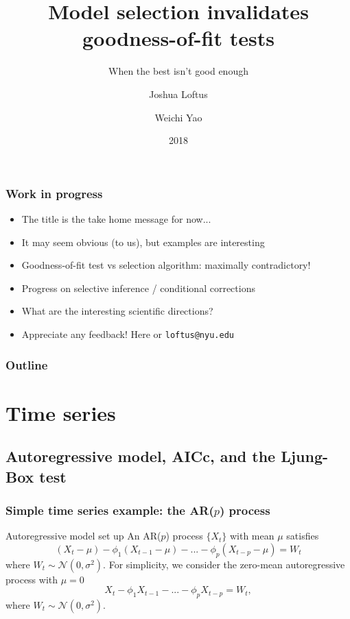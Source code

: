 \documentclass{beamer}
\title[Selection and goodness-of-fit tests]{Model selection invalidates goodness-of-fit tests}
\subtitle{When the best isn't good enough}
\author[J. R. Loftus]{Joshua Loftus \and Weichi Yao}
\institute[NYU]{New York University}
\date{2018}
\begin{document}
\frame{\titlepage}


\begin{frame}
\frametitle{Work in progress}

\begin{itemize}
\item The title is the take home message for now...
\item It may seem obvious (to us), but examples are interesting
\item Goodness-of-fit test vs selection algorithm: maximally contradictory!
\item Progress on selective inference / conditional corrections
\item What are the interesting scientific directions?
\item Appreciate any feedback! Here or \texttt{loftus@nyu.edu}
\end{itemize}

\end{frame}

\begin{frame}
\frametitle{Outline} %
\tableofcontents %
\end{frame}


\section{Time series}
\subsection{Autoregressive model, AICc, and the Ljung-Box test}
\begin{frame}
\frametitle{Simple time series example: the AR($p$) process}
\begin{block}{Autoregressive model set up}
An AR($p$) process $\{X_t\}$ with mean $\mu$ satisfies
\begin{equation*}
(X_t-\mu) -\phi_1(X_{t-1}-\mu)-...-\phi_p(X_{t-p}-\mu)=W_t
\end{equation*}
where $W_t\sim\mathcal{N}(0,\sigma^2)$. For simplicity, we consider the zero-mean autoregressive process with $\mu = 0$
\begin{equation*}
X_t -\phi_1X_{t-1}-...-\phi_pX_{t-p}=W_t,
\end{equation*}
where $W_t\sim\mathcal{N}(0,\sigma^2)$. 
\end{block}
\end{frame}
\end{document}
